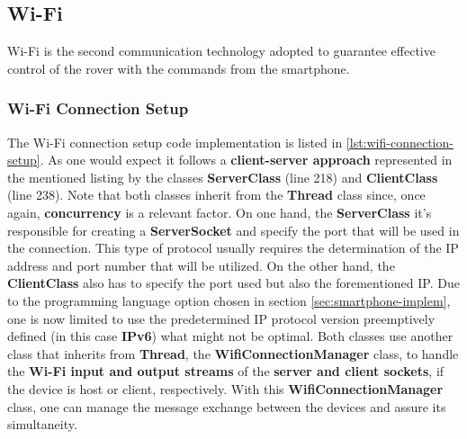 \subsection{Wi-Fi}%
\label{sec:wifi-implem}
%
Wi-Fi is the second communication technology adopted to guarantee effective control of the rover with the commands from the smartphone.
%
\subsubsection{Wi-Fi Connection Setup}
\label{sec:wifi-implem-connection}
%
The Wi-Fi connection setup code implementation is listed in \ref{lst:wifi-connection-setup}. As one would expect it follows a \textbf{client-server approach} represented in the mentioned listing by the classes \textbf{ServerClass} (line 218) and \textbf{ClientClass} (line 238). Note that both classes inherit from the \textbf{Thread} class since, once again, \textbf{concurrency} is a relevant factor. On one hand, the \textbf{ServerClass} it's responsible for creating a \textbf{ServerSocket} and specify the port that will be used in the connection. This type of protocol usually requires the determination of the IP address and port number that will be utilized. On the other hand, the \textbf{ClientClass} also has to specify the port used but also the forementioned IP. Due to the programming language option chosen in section \ref{sec:smartphone-implem}, one is now limited to use the predetermined IP protocol version preemptively defined (in this case \textbf{IPv6}) what might not be optimal. Both classes use another class that inherits from \textbf{Thread}, the \textbf{WifiConnectionManager} class, to handle the\textbf{ Wi-Fi input and output streams} of the \textbf{server and client sockets}, if the device is host or client, respectively. With this \textbf{WifiConnectionManager} class, one can manage the message exchange between the devices and assure its simultaneity.\\
%

%
